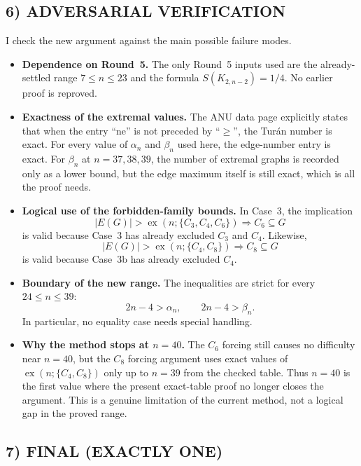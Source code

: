 \subsection*{6) ADVERSARIAL VERIFICATION}

I check the new argument against the main possible failure modes.

\begin{itemize}
\item \textbf{Dependence on Round~5.}
The only Round~5 inputs used are the already-settled range $7\le n\le 23$ and the formula $S(K_{2,n-2})=1/4$.
No earlier proof is reproved.

\item \textbf{Exactness of the extremal values.}
The ANU data page explicitly states that when the entry ``ne'' is not preceded by ``$\ge$'', the Tur\'an number is exact.
For every value of $\alpha_n$ and $\beta_n$ used here, the edge-number entry is exact.
For $\beta_n$ at $n=37,38,39$, the number of extremal graphs is recorded only as a lower bound, but the edge maximum itself is still exact, which is all the proof needs.

\item \textbf{Logical use of the forbidden-family bounds.}
In Case~3, the implication
\[
|E(G)|>\operatorname{ex}(n;\{C_3,C_4,C_6\}) \Longrightarrow C_6\subseteq G
\]
is valid because Case~3 has already excluded $C_3$ and $C_4$.
Likewise,
\[
|E(G)|>\operatorname{ex}(n;\{C_4,C_8\}) \Longrightarrow C_8\subseteq G
\]
is valid because Case~3b has already excluded $C_4$.

\item \textbf{Boundary of the new range.}
The inequalities are strict for every $24\le n\le 39$:
\[
2n-4>\alpha_n,
\qquad
2n-4>\beta_n.
\]
In particular, no equality case needs special handling.

\item \textbf{Why the method stops at $n=40$.}
The $C_6$ forcing still causes no difficulty near $n=40$, but the $C_8$ forcing argument uses exact values of $\operatorname{ex}(n;\{C_4,C_8\})$ only up to $n=39$ from the checked table.
Thus $n=40$ is the first value where the present exact-table proof no longer closes the argument.
This is a genuine limitation of the current method, not a logical gap in the proved range.
\end{itemize}

\subsection*{7) FINAL (EXACTLY ONE)}

